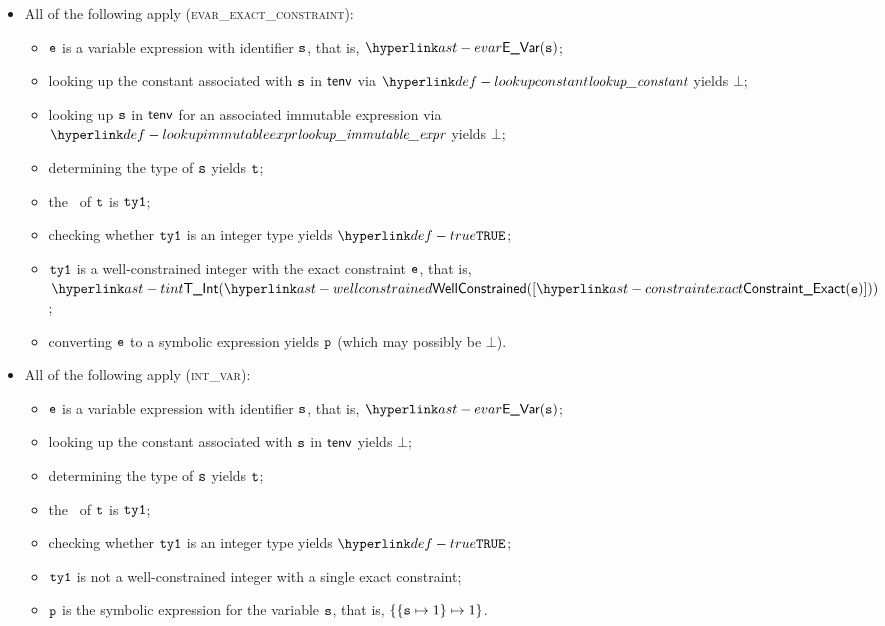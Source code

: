 \begin{itemize}
  \item All of the following apply (\textsc{evar\_exact\_constraint}):
  \begin{itemize}
    \item $\texttt{e}$ is a variable expression with identifier $\texttt{s}$, that is, $\EVar(\vs)$;
    \item looking up the constant associated with $\texttt{s}$ in $\textsf{tenv}$ via $\lookupconstant$ yields $\bot$;
    \item looking up $\texttt{s}$ in $\textsf{tenv}$ for an associated immutable expression via \\
          $\lookupimmutableexpr$ yields $\bot$;
    \item determining the type of $\texttt{s}$ yields $\texttt{t}$\ProseOrTypeError;
    \item the \underlyingtype\ of $\texttt{t}$ is $\texttt{ty1}$\ProseOrTypeError;
    \item checking whether $\texttt{ty1}$ is an integer type yields $\True$\ProseOrTypeError;
    \item $\texttt{ty1}$ is a well-constrained integer with the exact constraint $\texttt{e}$, that is, \\ $\TInt(\wellconstrained([\ConstraintExact(\ve)]))$;
    \item converting $\texttt{e}$ to a symbolic expression yields $\texttt{p}$ (which may possibly be $\bot$).
  \end{itemize}

  \item All of the following apply (\textsc{int\_var}):
  \begin{itemize}
    \item $\texttt{e}$ is a variable expression with identifier $\texttt{s}$, that is, $\EVar(\vs)$;
    \item looking up the constant associated with $\texttt{s}$ in $\textsf{tenv}$ yields $\bot$;
    \item determining the type of $\texttt{s}$ yields $\texttt{t}$\ProseOrTypeError;
    \item the \underlyingtype\ of $\texttt{t}$ is $\texttt{ty1}$\ProseOrTypeError;
    \item checking whether $\texttt{ty1}$ is an integer type yields $\True$\ProseOrTypeError;
    \item $\texttt{ty1}$ is not a well-constrained integer with a single exact constraint;
    \item $\texttt{p}$ is the symbolic expression for the variable $\texttt{s}$, that is, $\{ \{\texttt{s}\mapsto 1\}\mapsto 1 \}$.
  \end{itemize}


\end{itemize}
